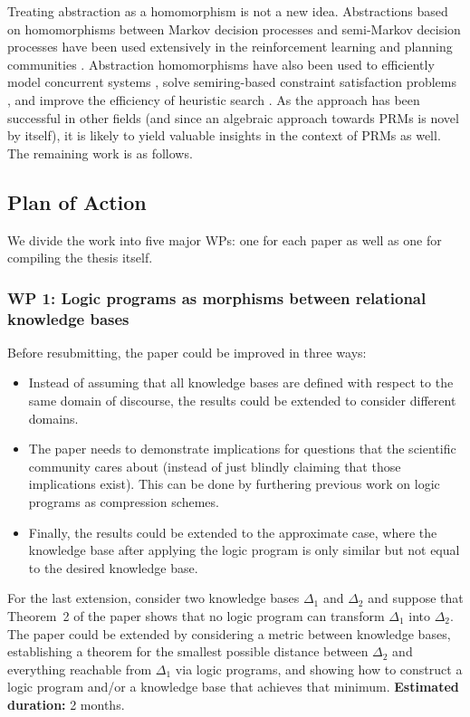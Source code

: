 \documentclass{article}
\begin{document}
Treating abstraction as a homomorphism is not a new idea. Abstractions based on
homomorphisms between Markov decision processes and semi-Markov decision
processes have been used extensively in the reinforcement learning and planning
communities
\cite{DBLP:conf/atal/JiangSL14,DBLP:conf/ijcai/RavindranB03,ravindran2004algebraic}.
Abstraction homomorphisms have also been used to efficiently model concurrent
systems \cite{DBLP:journals/jcss/Castellani87,DBLP:journals/topnoc/DeselM10},
solve semiring-based constraint satisfaction problems
\cite{DBLP:journals/tcs/LiY08}, and improve the efficiency of heuristic search
\cite{DBLP:conf/aaai/HoltePZM96}. As the approach has been successful in other
fields (and since an algebraic approach towards PRMs is novel by itself), it is
likely to yield valuable insights in the context of PRMs as well. The remaining
work is as follows.

\subsection{Plan of Action}

We divide the work into five major WPs: one for each paper as well as one for
compiling the thesis itself.

\subsubsection{WP 1: Logic programs as morphisms between relational knowledge
  bases}

Before resubmitting, the paper could be improved in three ways:
\begin{itemize}
\item Instead of assuming that all knowledge bases are defined with respect to
  the same domain of discourse, the results could be extended to consider
  different domains.
\item The paper needs to demonstrate implications for questions that the
  scientific community cares about (instead of just blindly claiming that those
  implications exist). This can be done by furthering previous work
  \cite{DBLP:conf/ijcai/DumancicGMB19} on logic programs as compression schemes.
\item Finally, the results could be extended to the approximate case, where the
  knowledge base after applying the logic program is only similar but not equal
  to the desired knowledge base.
\end{itemize}
For the last extension, consider two knowledge bases $\Delta_1$ and $\Delta_2$
and suppose that Theorem~2 of the paper shows that no logic program can
transform $\Delta_1$ into $\Delta_2$. The paper could be extended by considering
a metric between knowledge bases, establishing a theorem for the smallest
possible distance between $\Delta_2$ and everything reachable from $\Delta_1$
via logic programs, and showing how to construct a logic program and/or a
knowledge base that achieves that minimum. {\bf Estimated duration:} 2 months.
\end{document}
